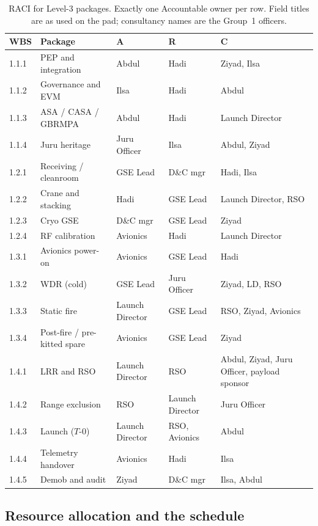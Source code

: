 \begin{table}[H]
\centering
\footnotesize
\setlength{\tabcolsep}{3.6pt}
\caption[RACI for Level-3 packages]{RACI for Level-3 packages. Exactly one Accountable owner per row. Field titles are as used on the pad; consultancy names are the Group~1 officers.}
\label{tab:raci}
\begin{tabularx}{\textwidth}{@{}l >{\raggedright\arraybackslash}p{3.15cm} >{\raggedright\arraybackslash}p{2.55cm} >{\raggedright\arraybackslash}p{2.35cm} X@{}}
\toprule
WBS & Package & A & R & C \\
\midrule
1.1.1 & PEP and integration & Abdul & Hadi & Ziyad, Ilsa \\
1.1.2 & Governance and EVM & Ilsa & Hadi & Abdul \\
1.1.3 & ASA / CASA / GBRMPA & Abdul & Hadi & Launch Director \\
1.1.4 & Juru heritage & Juru Officer & Ilsa & Abdul, Ziyad \\
1.2.1 & Receiving / cleanroom & GSE Lead & D\&C mgr & Hadi, Ilsa \\
1.2.2 & Crane and stacking & Hadi & GSE Lead & Launch Director, RSO \\
1.2.3 & Cryo GSE & D\&C mgr & GSE Lead & Ziyad \\
1.2.4 & RF calibration & Avionics & Hadi & Launch Director \\
1.3.1 & Avionics power-on & Avionics & GSE Lead & Hadi \\
1.3.2 & WDR (cold) & GSE Lead & Juru Officer & Ziyad, LD, RSO \\
1.3.3 & Static fire & Launch Director & GSE Lead & RSO, Ziyad, Avionics \\
1.3.4 & Post-fire / pre-kitted spare & Avionics & GSE Lead & Ziyad \\
1.4.1 & LRR and RSO & Launch Director & RSO & Abdul, Ziyad, Juru Officer, payload sponsor \\
1.4.2 & Range exclusion & RSO & Launch Director & Juru Officer \\
1.4.3 & Launch ($T$-0) & Launch Director & RSO, Avionics & Abdul \\
1.4.4 & Telemetry handover & Avionics & Hadi & Ilsa \\
1.4.5 & Demob and audit & Ziyad & D\&C mgr & Ilsa, Abdul \\
\bottomrule
\end{tabularx}
\end{table}

\subsection{Resource allocation and the schedule}
\label{sec:resource-capacity}

